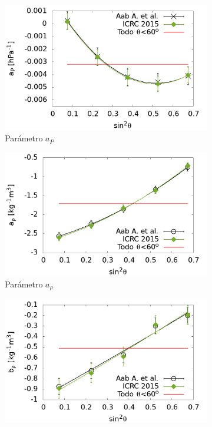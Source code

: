 					\begin{figure}[H]
        				\begin{subfigure}[b]{0.5\textwidth}
        				\includegraphics[width=\linewidth]{../clima/Graphs/params/ap_ICRC_2015_above_1EeV.png}
						\caption{Parámetro $a_P$ }
						\label{fig:ap_2015}
        				\end{subfigure}%
        				\hspace{\fill}
        				\begin{subfigure}[b]{0.5\textwidth}
        				\includegraphics[width=\linewidth]{../clima/Graphs/params/arho_ICRC_2015_above_1EeV.png}
						\caption{Parámetro $a_{\rho}$ }
						\label{fig:arho_2015}
        				\end{subfigure}%
        				\hspace{\fill}
        				\begin{subfigure}[b]{\textwidth}
        				\centering
        				\includegraphics[width=0.5\linewidth]{../clima/Graphs/params/brho_ICRC_2015_above_1EeV.png}

\end{subfigure}
\end{figure}
